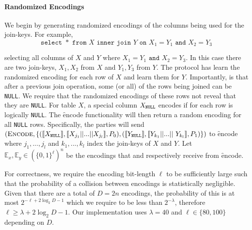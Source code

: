 \paragraph{Randomized Encodings}
We begin by generating randomized encodings of the columns being used for the join-keys. For example, 
\iffullversion
$$
	\texttt{select }* \texttt{ from } X \texttt{ inner join } Y \texttt{ on } X_1 = Y_1 \texttt{ and } X_2 = Y_3
$$

\else
selecting all columns of $X$ and $Y$ where $X_1 = Y_1 \texttt{ and } X_2 = Y_3$.
\fi
In this case there are two join-keys, $X_1,X_2$ from $X$ and $Y_1,Y_3$ from $Y$. The protocol has  learn the randomized encoding for each row of $X$ and  learn them for $Y$. Importantly, is that after a previous join operation, some (or all) of the rows being joined can be \texttt{NULL}. We require that the randomized encodings of these rows not reveal that they are \texttt{NULL}. For table $X$, a special column $X_\texttt{NULL}$ encodes if for each row is logically \texttt{NULL}. The \f{encode} functionality will then return a random encoding for all \texttt{NULL} rows. Specifically, the parties will send $(\textsc{Encode}, \{(\share{\XNull}, \share{X_{j_1}||...||X_{j_l}}, \Party{0}), (\share{\YNull}, \share{Y_{k_1}||...||$ $Y_{k_l}}, \Party{1})\})$ to \f{encode} where $j_1,...,j_l$ and $k_1,...,k_l$ index the join-keys of $X$ and $Y$. Let $\mathbb{E}_x,\mathbb{E}_y\in(\{0,1\}^{\ell})^n$ be the encodings that  and  respectively receive from \f{encode}.


For correctness, we require the encoding bit-length $\ell$ to be sufficiently large such that the probability of a collision between encodings is statistically negligible. Given that there are a total of $D=2n$ encodings, the probability of this is at most $2^{-\ell+2\log_2 D-1}$ which we require to be less than $2^{-\lambda}$, therefore $\ell\geq \lambda+2\log_2 D -1$. Our implementation uses $\lambda=40$ and $\ell\in\{80,100\}$ depending on $D$.




